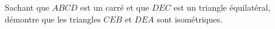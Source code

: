 %
%
    Sachant que $ABCD$ est un carré et que $DEC$ est un triangle équilatéral, démontre que les triangles $CEB$ et $DEA$ sont isométriques.
    \begin{center}
        
    \end{center}
